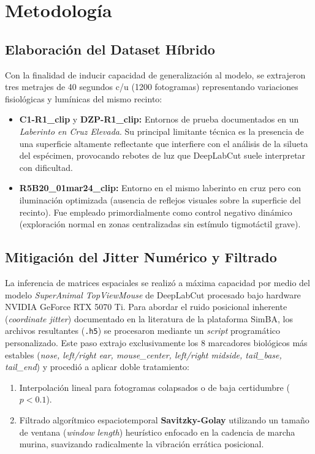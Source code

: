 \documentclass[12pt,a4paper]{article}
\begin{document}
\section{Metodología}

\subsection{Elaboración del Dataset Híbrido}
Con la finalidad de inducir capacidad de generalización al modelo, se extrajeron tres metrajes de 40 segundos c/u (1200 fotogramas) representando variaciones fisiológicas y lumínicas del mismo recinto:
\begin{itemize}
    \item \textbf{C1-R1\_clip} y \textbf{DZP-R1\_clip:} Entornos de prueba documentados en un \textit{Laberinto en Cruz Elevada}. Su principal limitante técnica es la presencia de una superficie altamente reflectante que interfiere con el análisis de la silueta del espécimen, provocando rebotes de luz que DeepLabCut suele interpretar con dificultad.
    \item \textbf{R5B20\_01mar24\_clip:} Entorno en el mismo laberinto en cruz pero con iluminación optimizada (ausencia de reflejos visuales sobre la superficie del recinto). Fue empleado primordialmente como control negativo dinámico (exploración normal en zonas centralizadas sin estímulo tigmotáctil grave).
\end{itemize}

\subsection{Mitigación del Jitter Numérico y Filtrado}
La inferencia de matrices espaciales se realizó a máxima capacidad por medio del modelo \textit{SuperAnimal TopViewMouse} de DeepLabCut procesado bajo hardware NVIDIA GeForce RTX 5070 Ti. 
Para abordar el ruido posicional inherente (\textit{coordinate jitter}) documentado en la literatura de la plataforma SimBA, los archivos resultantes (\texttt{.h5}) se procesaron mediante un \textit{script} programático personalizado. Este paso extrajo exclusivamente los 8 marcadores biológicos más estables (\textit{nose, left/right ear, mouse\_center, left/right midside, tail\_base, tail\_end}) y procedió a aplicar doble tratamiento:
\begin{enumerate}
    \item Interpolación lineal para fotogramas colapsados o de baja certidumbre ($p < 0.1$).
    \item Filtrado algorítmico espaciotemporal \textbf{Savitzky-Golay} utilizando un tamaño de ventana (\textit{window length}) heurístico enfocado en la cadencia de marcha murina, suavizando radicalmente la vibración errática posicional.
\end{enumerate}
\end{document}

